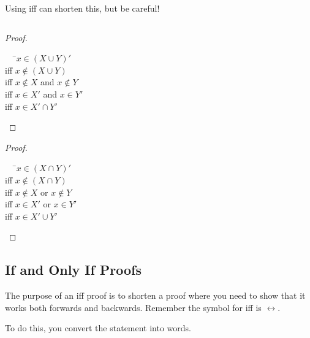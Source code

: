\documentclass[\main/notes.tex]{subfiles}
\begin{document}
			Using iff can shorten this, but be careful!
			\begin{example}
				$ $\\
				\begin{minipage}{0.4\textwidth}
					\begin{proof}
						$ $
						\begin{tabbing}
							$\quad$ \=$x \in (X \cup Y)'$\\
							iff \>$x \notin (X \cup Y)$\\
							iff \>$x \notin X$ and $x \notin Y$\\
							iff \>$x \in X'$ and $x \in Y'$\\
							iff \>$x \in X' \cap Y'$
						\end{tabbing}
					\end{proof}
				\end{minipage}
				\hfill
				\begin{minipage}{0.4\textwidth}
					\begin{proof}
						$ $ 
						\begin{tabbing}
							$\quad$ \=$x \in (X \cap Y)'$\\
							iff \> $x \notin (X \cap Y)$\\
							iff \> $x \notin X$ or $x \notin Y$\\
							iff \> $x \in X'$ or $x \in Y'$\\
							iff \> $x \in X' \cup Y'$
						\end{tabbing}
					\end{proof}
				\end{minipage}
			\end{example}
			\pagebreak
			\subsection{If and Only If Proofs}
			The purpose of an iff proof is to shorten a proof where you need to show that it works both forwards and backwards. Remember the symbol for iff is $\leftrightarrow$.

			To do this, you convert the statement into words.
\end{document}
